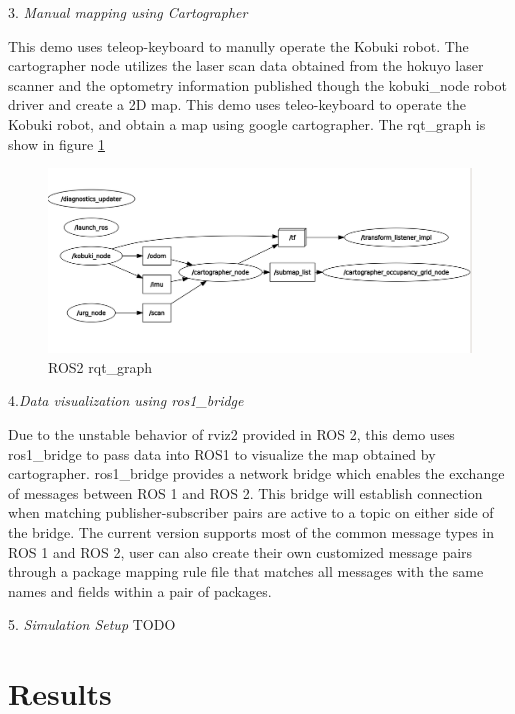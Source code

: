 \documentclass[letterpaper, 10 pt, conference]{ieeeconf}  %
\begin{document}
3. \textit{Manual mapping using Cartographer}\par\vspace{5pt}
This demo uses teleop-keyboard to manully operate the Kobuki robot. The cartographer node utilizes the laser scan data obtained from the hokuyo laser scanner and the optometry information published though the kobuki\_node robot driver and create a 2D map. 
This demo uses teleo-keyboard to operate the Kobuki robot, and obtain a map using google cartographer. The rqt\_graph is show in figure \ref{fig:rqt}\par\vspace{5pt}
\begin{figure}[ht]
  \includegraphics[width=\linewidth]{qrt_graph.png}
  \caption{ROS2 rqt\_graph} 
  \label{fig:rqt}
\end{figure}
4.\textit{Data visualization using ros1\_bridge}\par\vspace{5pt} 
Due to the unstable behavior of rviz2 provided in ROS 2, this demo uses ros1\_bridge to pass data into ROS1 to visualize the map obtained by cartographer. ros1\_bridge provides a network bridge which enables the exchange of messages between ROS 1 and ROS 2. This bridge will establish connection when matching publisher-subscriber pairs are active to a topic on either side of the bridge. The current version supports most of the common message types in ROS 1 and ROS 2, user can also create their own customized message pairs through a package mapping rule file that matches all messages with the same names and fields within a pair of packages.\par\vspace{5pt} 

5. \textit{Simulation Setup} 
TODO


\section{Results}\label{results}
\end{document}
